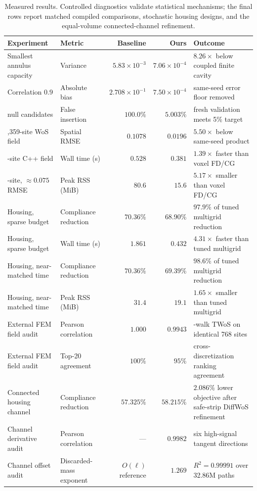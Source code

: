 \begin{table}[!htbp]
\centering
\caption{Measured results. Controlled diagnostics validate statistical mechanisms; the final rows report matched compiled comparisons, stochastic housing designs, and the equal-volume connected-channel refinement.}
\label{tab:controlledresults}
\begin{tabularx}{\textwidth}{@{}>{\raggedright\arraybackslash}p{}>{\raggedright\arraybackslash}p{}rr>{\raggedright\arraybackslash}X@{}}
\toprule
Experiment & Metric & Baseline & Ours & Outcome \\
\midrule
Smallest annulus capacity & Variance & $5.83\times10^{-3}$ & $7.06\times10^{-4}$ & $8.26\times$ below coupled finite cavity \\
Correlation $0.9$ & Absolute bias & $2.708\times10^{-1}$ & $7.50\times10^{-4}$ & same-seed error floor removed \\
256 null candidates & False insertion & $100.0\%$ & $5.003\%$ & fresh validation meets 5\% target \\
6,359-site WoS field & Spatial RMSE & $0.1078$ & $0.0196$ & $5.50\times$ below same-seed product \\
64-site C++ field & Wall time (s) & $0.528$ & $0.381$ & $1.39\times$ faster than voxel FD/CG \\
384-site, $\approx0.075$ RMSE & Peak RSS (MiB) & $80.6$ & $15.6$ & $5.17\times$ smaller than voxel FD/CG \\
Housing, sparse budget & Compliance reduction & $70.36\%$ & $68.90\%$ & $97.9\%$ of tuned multigrid reduction \\
Housing, sparse budget & Wall time (s) & $1.861$ & $0.432$ & $4.31\times$ faster than tuned multigrid \\
Housing, near-matched time & Compliance reduction & $70.36\%$ & $69.39\%$ & $98.6\%$ of tuned multigrid reduction \\
Housing, near-matched time & Peak RSS (MiB) & $31.4$ & $19.1$ & $1.65\times$ smaller than tuned multigrid \\
External FEM field audit & Pearson correlation & $1.000$ & $0.9943$ & 512-walk TWoS on identical 768 sites \\
External FEM field audit & Top-20 agreement & $100\%$ & $95\%$ & cross-discretization ranking agreement \\
Connected housing channel & Compliance reduction & $57.325\%$ & $58.215\%$ & $2.086\%$ lower objective after safe-strip DiffWoS refinement \\
Channel derivative audit & Pearson correlation & --- & $0.9982$ & six high-signal tangent directions \\
Channel offset audit & Discarded-mass exponent & $O(\ell)$ reference & $1.269$ & $R^2=0.99991$ over 32.86M paths \\
\bottomrule
\end{tabularx}
\end{table}

